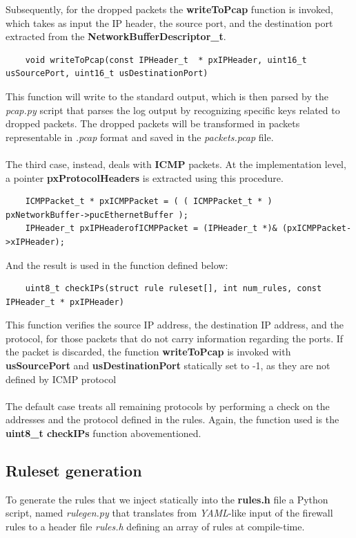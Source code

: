 \documentclass{exam}
\begin{document}
Subsequently, for the dropped packets the \textbf{writeToPcap} function is invoked, which takes as input the IP header, the source port, and the destination port extracted from the \textbf{NetworkBufferDescriptor\_t}.
\begin{lstlisting}
    void writeToPcap(const IPHeader_t  * pxIPHeader, uint16_t usSourcePort, uint16_t usDestinationPort)
\end{lstlisting}
This function will write to the standard output, which is then parsed by the \textit{pcap.py} script that parses the log output by recognizing specific keys related to dropped packets. The dropped packets will be transformed in packets representable in \textit{.pcap} format and saved in the \textit{packets.pcap} file.\\
\\The third case, instead, deals with \textbf{ICMP} packets. At the implementation level, a pointer \textbf{pxProtocolHeaders} is extracted using this procedure.
\begin{lstlisting}
    ICMPPacket_t * pxICMPPacket = ( ( ICMPPacket_t * ) pxNetworkBuffer->pucEthernetBuffer );
    IPHeader_t pxIPHeaderofICMPPacket = (IPHeader_t *)& (pxICMPPacket->xIPHeader);
\end{lstlisting}
And the result is used in the function defined below:
\begin{lstlisting}
    uint8_t checkIPs(struct rule ruleset[], int num_rules, const IPHeader_t * pxIPHeader)
\end{lstlisting}
This function verifies the source IP address, the destination IP address, and the protocol, for those packets that do not carry information regarding the ports. If the packet is discarded, the function \textbf{writeToPcap} is invoked with \textbf{usSourcePort} and \textbf{usDestinationPort} statically set to -1, as they are not defined by ICMP protocol\\
\\The default case treats all remaining protocols by performing a check on the addresses and the protocol defined in the rules. Again, the function used is the \textbf{uint8\_t checkIPs} function abovementioned.
\subsection{Ruleset generation}
To generate the rules that we inject statically into the \textbf{rules.h} file a Python script, named \textit{rulegen.py} that translates from \textit{YAML}-like input of the firewall rules to a header file \textit{rules.h} defining an array of rules at compile-time.
\end{document}
